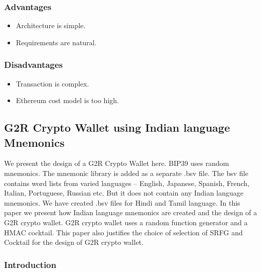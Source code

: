\documentclass[12pt]{article}
\begin{document}
\newpage
\subsubsection{Advantages}
\begin{itemize}
\item Architecture is simple.
\item Requirements are natural.

\end{itemize}
\vspace{10px}
\subsubsection{Disadvantages}
\begin{itemize}
\item Transaction is complex.
\item Ethereum cost model is too high.

\end{itemize}
\vspace{10px}





\newpage
\subsection{G2R Crypto Wallet using Indian language Mnemonics }

We present the design of a G2R Crypto Wallet
here. BIP39 uses random mnemonics. The mnemonic
library is added as a separate .bsv file. The bsv file contains
word lists from varied languages – English, Japanese,
Spanish, French, Italian, Portuguese, Russian etc. But it
does not contain any Indian language mnemonics. We have
created .bsv files for Hindi and Tamil language. In this
paper we present how Indian language mnemonics are
created and the design of a G2R crypto wallet. G2R crypto
wallet uses a random function generator and a HMAC
cocktail. This paper also justifies the choice of selection of
SRFG and Cocktail for the design of G2R crypto wallet.

\subsubsection{Introduction}
\end{document}
